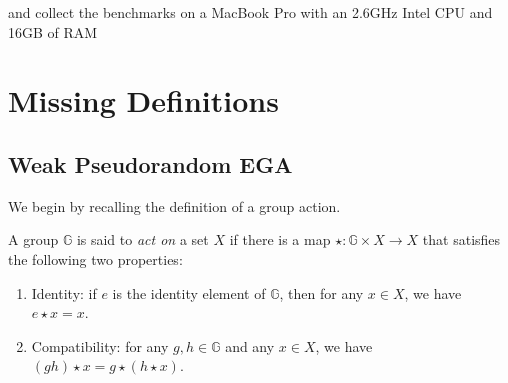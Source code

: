 \documentclass[a4paper,10pt]{article}
\begin{document}
and collect the benchmarks on a MacBook Pro with an 2.6GHz Intel CPU and 16GB of RAM

          




\appendix

\section{Missing Definitions}
\subsection{Weak Pseudorandom EGA}
We begin by recalling the definition of a group action. 
\begin{definition}
A group $\mathbb{G}$ is said to \emph{act on} a set $X$ if there is a map $\star: \mathbb{G} \times X \rightarrow X$ 
that satisfies the following two properties: 
\begin{enumerate}
    \item Identity: if $e$ is the identity element of $\mathbb{G}$, then for any $x \in X$, we have $e \star x = x$. 
    \item Compatibility: for any $g, h \in \mathbb{G}$ and any $x \in X$, 
        we have $(gh) \star x = g \star (h \star x)$. 
\end{enumerate}
\end{definition}
\end{document}
